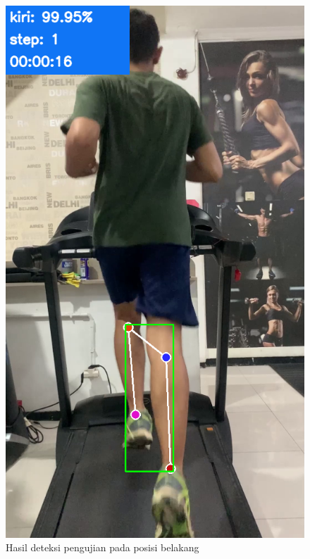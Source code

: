 \begin{figure}[H]
  \centering
  \includegraphics[scale=0.4]{gambar/posisi_belakang2.png}
  \caption{Hasil deteksi pengujian pada posisi belakang}
  \label{fig:PengujianPosisiBelakang2}
\end{figure}

